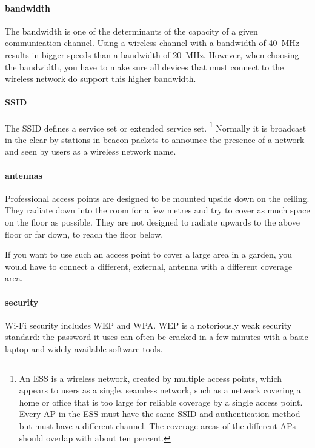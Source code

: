 \paragraph{bandwidth}
The bandwidth is one of the determinants of the capacity of a given communication channel.
Using a wireless channel with a bandwidth of \SI{40}{\mega\hertz} results in bigger speeds than a bandwidth of \SI{20}{\mega\hertz}.
However, when choosing the bandwidth, you have to make sure all devices that must connect to the wireless network do support this higher bandwidth.

\paragraph{SSID}
The \ac{SSID} defines a service set or extended service set.%
\footnote{%
   An \ac{ESS} is a wireless network, created by multiple access points, which appears to users as a single, seamless network, such as a network covering a home or office that is too large for reliable coverage by a single access point.
   Every \acf{AP} in the \acs{ESS} must have the same \acs{SSID} and authentication method but must have a different channel.
   The coverage areas of the different \aclp{AP} should overlap with about ten percent.
   }
Normally it is broadcast in the clear by stations in beacon packets to announce the presence of a network and seen by users as a wireless network name.

\paragraph{antennas}
Professional access points are designed to be mounted upside down on the ceiling.
They radiate down into the room for a few metres and try to cover as much space on the floor as possible.
They are not designed to radiate upwards to the above floor or far down, to reach the floor below.

If you want to use such an access point to cover a large area in a garden, you would have to connect a different, external, antenna with a different coverage area.

\paragraph{security}
Wi-Fi security includes \ac{WEP} and \ac{WPA}.
\ac{WEP} is a notoriously weak security standard: the password it uses can often be cracked in a few minutes with a basic laptop and widely available software tools.

